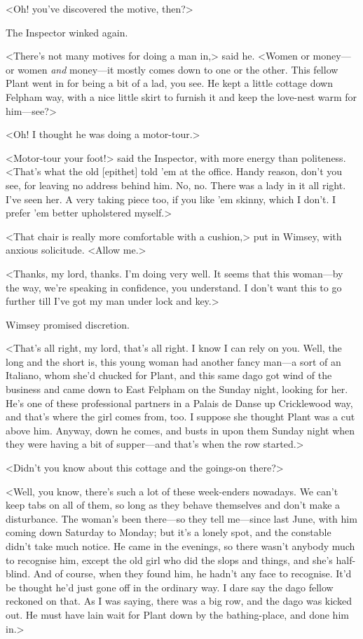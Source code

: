 <Oh! you've discovered the motive, then?>

The Inspector winked again.

<There's not many motives for doing a man in,> said he. <Women or money—or women \textit{and} money—it mostly comes down to one or the other. This fellow Plant went in for being a bit of a lad, you see. He kept a little cottage down Felpham way, with a nice little skirt to furnish it and keep the love-nest warm for him—see?>

<Oh! I thought he was doing a motor-tour.>

<Motor-tour your foot!> said the Inspector, with more energy than politeness. <That's what the old [epithet] told 'em at the office. Handy reason, don't you see, for leaving no address behind him. No, no. There was a lady in it all right. I've seen her. A very taking piece too, if you like 'em skinny, which I don't. I prefer 'em better upholstered myself.>

<That chair is really more comfortable with a cushion,> put in Wimsey, with anxious solicitude. <Allow me.>

<Thanks, my lord, thanks. I'm doing very well. It seems that this woman—by the way, we're speaking in confidence, you understand. I don't want this to go further till I've got my man under lock and key.>

Wimsey promised discretion.

<That's all right, my lord, that's all right. I know I can rely on you. Well, the long and the short is, this young woman had another fancy man—a sort of an Italiano, whom she'd chucked for Plant, and this same dago got wind of the business and came down to East Felpham on the Sunday night, looking for her. He's one of these professional partners in a Palais de Danse up Cricklewood way, and that's where the girl comes from, too. I suppose she thought Plant was a cut above him. Anyway, down he comes, and busts in upon them Sunday night when they were having a bit of supper—and that's when the row started.>

<Didn't you know about this cottage and the goings-on there?>

<Well, you know, there's such a lot of these week-enders nowadays. We can't keep tabs on all of them, so long as they behave themselves and don't make a disturbance. The woman's been there—so they tell me—since last June, with him coming down Saturday to Monday; but it's a lonely spot, and the constable didn't take much notice. He came in the evenings, so there wasn't anybody much to recognise him, except the old girl who did the slops and things, and she's half-blind. And of course, when they found him, he hadn't any face to recognise. It'd be thought he'd just gone off in the ordinary way. I dare say the dago fellow reckoned on that. As I was saying, there was a big row, and the dago was kicked out. He must have lain wait for Plant down by the bathing-place, and done him in.>

